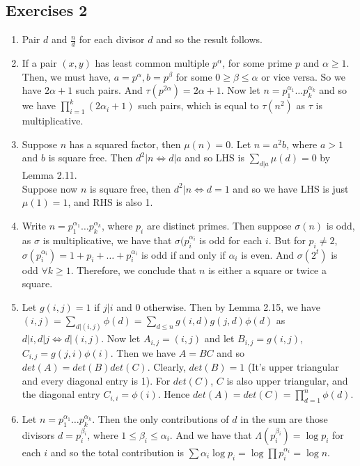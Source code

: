 \subsection{Exercises 2}
\begin{enumerate}
\item Pair $d$ and $\frac{n}{d}$ for each divisor $d$ and so the result follows.
\item If a pair $(x,y)$ has least common multiple $p^\alpha$, for some prime $p$ and $\alpha \ge 1$. Then, we must have, $a = p^\alpha, b = p^\beta$ for some $0 \ge \beta \le \alpha$ or vice versa. So we have $2\alpha +1$ such pairs. And $\tau(p^{2\alpha})=2\alpha+1$. Now let $n=p_1^{\alpha_1} \ldots p_k^{\alpha_k}$ and so we have $\prod_{i=1}^k (2\alpha_i +1)$ such pairs, which is equal to $\tau(n^2)$ as $\tau$ is multiplicative.\\
\item Suppose $n$ has a squared factor, then $\mu(n)=0$. Let $n=a^2 b$, where $a > 1$ and $b$ is square free. Then $d^2 | n \iff d|a$ and so LHS is $\sum_{d|a}\mu(d) = 0$ by Lemma 2.11.\\
    Suppose now $n$ is square free, then $d^2 |n \iff d=1$ and so we have LHS is just $\mu(1)=1$, and RHS is also 1.
\item Write $n=p_1^{\alpha_1} \ldots p_k^{\alpha_k}$, where $p_i$ are distinct primes. Then suppose $\sigma(n)$ is odd, as $\sigma$ is multiplicative, we have that $\sigma(p_i^{\alpha_i}$ is odd for each $i$. But for $p_i \neq 2$, $\sigma(p_i^{\alpha_i})=1+p_i+ \ldots + p_i^{\alpha_i}$ is odd if and only if $\alpha_i$ is even. And $\sigma(2^t)$ is odd $\forall k \ge 1$. Therefore, we conclude that $n$ is either a square or twice a square.
\item Let $g(i,j)=1$ if $j|i$ and $0$ otherwise. Then by Lemma 2.15, we have $(i,j)=\sum_{d|(i,j)}\phi(d) =\sum_{d \le n}g(i,d)g(j,d)\phi(d)$ as $d|i,d|j \iff d|(i,j)$. Now let $A_{i,j}=(i,j)$ and let $B_{i,j}=g(i,j)$, $C_{i,j}=g(j,i)\phi(i)$. Then we have $A=BC$ and so $det(A)=det(B)det(C)$. Clearly, $det(B)=1$ (It's upper triangular and every diagonal entry is 1). For $det(C)$, $C$ is also upper triangular, and the diagonal entry $C_{i,i}=\phi(i)$. Hence $det(A)=det(C)=\prod_{d=1}^n \phi(d)$.
\item Let $n = p_1^{\alpha_1} \ldots p_k^{\alpha_k}$. Then the only contributions of $d$ in the sum are those divisors $d=p_i^{\beta_i}$, where $1 \le \beta_i \le \alpha_i$. And we have that $\Lambda(p_i^{\beta_i})= \log{p_i}$ for each $i$ and so the total contribution is $\sum \alpha_i \log{p_i} = \log{\prod p_i^{\alpha_i}} = \log{n}$.\\

\end{enumerate}
